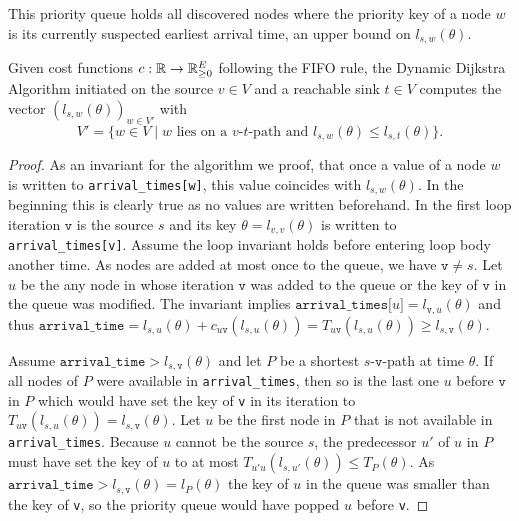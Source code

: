 This priority queue holds all discovered nodes where the priority key of a node $w$ is its currently suspected earliest arrival time, an upper bound on $l_{s,w}(\theta)$.


\begin{proposition}
    Given cost functions $c:\mathbb{R} \rightarrow \mathbb{R}_{\geq0}^E$ following the FIFO rule, the Dynamic Dijkstra Algorithm initiated on the source $v\in V$ and a reachable sink $t\in V$ computes the vector $(l_{s,w}(\theta))_{w\in V'}$ with \[
        V' = \{ w\in V \mid \text{$w$ lies on a $v$-$t$-path and $l_{s,w}(\theta) \leq l_{s,t}(\theta)$} \}.
    \]
\end{proposition}
\begin{proof}
    As an invariant for the algorithm we proof, that once a value of a node $w$ is written to \texttt{arrival\_times[w]}, this value coincides with $l_{s,w}(\theta)$.
    In the beginning this is clearly true as no values are written beforehand.
    In the first loop iteration $\texttt{v}$ is the source $s$ and its key $\theta= l_{v,v}(\theta)$ is written to \texttt{arrival\_times[v]}.
    Assume the loop invariant holds before entering loop body another time.
    As nodes are added at most once to the queue, we have $\texttt{v} \neq s$.
    Let $u$ be the any node in whose iteration $\texttt{v}$ was added to the queue or the key of $\texttt{v}$ in the queue was modified.
    The invariant implies $\texttt{arrival\_times[}u\texttt{]} = l_{\texttt{v},u}(\theta)$ and thus $\texttt{arrival\_time} = l_{s,u}(\theta) + c_{u\texttt{v}}(l_{s,u}(\theta)) = T_{u\texttt{v}}(l_{s,u}(\theta)) \geq l_{s,\texttt{v}}(\theta)$.

    Assume $\texttt{arrival\_time} > l_{s,\texttt{v}}(\theta)$ and let $P$ be a shortest $s$-$\texttt{v}$-path at time $\theta$.
    If all nodes of $P$ were available in \texttt{arrival\_times}, then so is the last one $u$ before $\texttt{v}$ in $P$ which would have set the key of \texttt{v} in its iteration to $T_{u\texttt{v}}(l_{s,u}(\theta)) = l_{s,\texttt{v}}(\theta)$.
    Let $u$ be the first node in $P$ that is not available in \texttt{arrival\_times}.
    Because $u$ cannot be the source $s$, the  predecessor $u'$ of $u$ in $P$ must have set the key of $u$ to at most $T_{u'u}(l_{s,u'}(\theta)) \leq T_P(\theta)$.
    As $\texttt{arrival\_time}>l_{s,\texttt{v}}(\theta) = l_P(\theta)$ the key of $u$ in the queue was smaller than the key of \texttt{v}, so the priority queue would have popped $u$ before \texttt{v}.
\end{proof}

